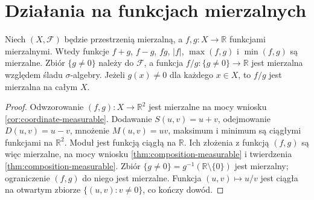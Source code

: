 \section{Działania na funkcjach mierzalnych}

\begin{twierdzenie}
\label{thm:measurable-algebra}
Niech $(X,\mathcal F)$ będzie przestrzenią mierzalną,
a $f,g:X\to\mathbb R$ funkcjami mierzalnymi.
Wtedy funkcje $f+g$, $f-g$, $fg$, $|f|$,
$\max(f,g)$ i $\min(f,g)$ są mierzalne.
Zbiór $\{g\ne0\}$ należy do $\mathcal F$, a
funkcja $f/g:\{g\ne0\}\to\mathbb R$ jest mierzalna
względem śladu $\sigma$-algebry. Jeżeli $g(x)\ne0$
dla każdego $x\in X$, to $f/g$ jest mierzalna na całym $X$.
\end{twierdzenie}
\begin{proof}
Odwzorowanie $(f,g):X\to\mathbb R^2$ jest mierzalne
na mocy wniosku \ref{cor:coordinate-measurable}.
Dodawanie $S(u,v)=u+v$, odejmowanie $D(u,v)=u-v$,
mnożenie $M(u,v)=uv$, maksimum i minimum są ciągłymi
funkcjami na $\mathbb R^2$. Moduł jest funkcją ciągłą
na $\mathbb R$. Ich złożenia z funkcją $(f,g)$ są
więc mierzalne, na mocy wniosku \ref{thm:composition-measurable}
i twierdzenia \ref{thm:composition-measurable}.
Zbiór $\{g\ne0\}=g^{-1}(\mathbb R\setminus\{0\})$
jest mierzalny; ograniczenie $(f,g)$ do niego jest
mierzalne. Funkcja $(u,v)\mapsto u/v$ jest ciągła
na otwartym zbiorze $\{(u,v):v\ne0\}$, co kończy dowód.
\end{proof}

